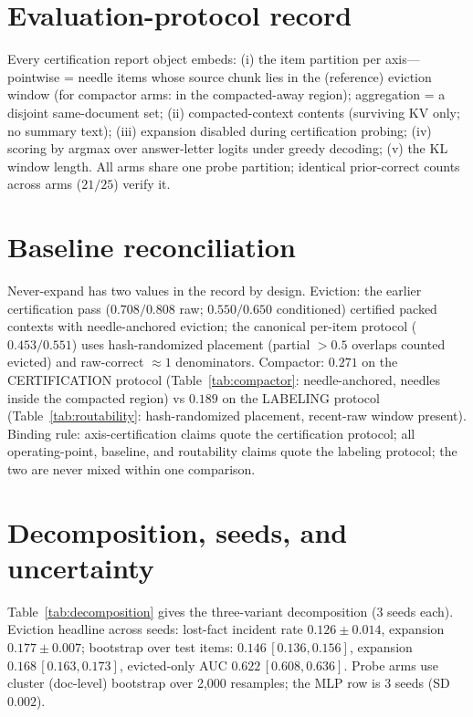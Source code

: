 \documentclass[11pt]{article}
\newcommand{\lostfact}{lost-fact incident rate}
\begin{document}
\appendix

\section{Evaluation-protocol record}
\label{app:protocol}
Every certification report object embeds: (i) the item partition per
axis---pointwise = needle items whose source chunk lies in the (reference)
eviction window (for compactor arms: in the compacted-away region);
aggregation = a disjoint same-document set; (ii) compacted-context contents
(surviving KV only; no summary text); (iii) expansion disabled during
certification probing; (iv) scoring by argmax over answer-letter logits under
greedy decoding; (v) the KL window length. All arms share one probe
partition; identical prior-correct counts across arms ($21/25$) verify it.

\section{Baseline reconciliation}
\label{app:reconciliation}
Never-expand has two values in the record by design. Eviction: the earlier
certification pass ($0.708/0.808$ raw; $0.550/0.650$ conditioned) certified
packed contexts with needle-anchored eviction; the canonical per-item
protocol ($0.453/0.551$) uses hash-randomized placement (partial $>0.5$
overlaps counted evicted) and raw-correct ${\approx}1$ denominators.
Compactor: $0.271$ on the CERTIFICATION protocol
(Table~\ref{tab:compactor}: needle-anchored, needles inside the compacted
region) vs $0.189$ on the LABELING protocol (Table~\ref{tab:routability}:
hash-randomized placement, recent-raw window present). Binding rule:
axis-certification claims quote the certification protocol; all
operating-point, baseline, and routability claims quote the labeling
protocol; the two are never mixed within one comparison.

\section{Decomposition, seeds, and uncertainty}
Table~\ref{tab:decomposition} gives the three-variant decomposition (3 seeds
each). Eviction headline across seeds: \lostfact{} $0.126 \pm 0.014$,
expansion $0.177 \pm 0.007$; bootstrap over test items:
$0.146\,[0.136, 0.156]$, expansion $0.168\,[0.163, 0.173]$, evicted-only AUC
$0.622\,[0.608, 0.636]$. Probe arms use cluster (doc-level) bootstrap over
2{,}000 resamples; the MLP row is 3 seeds (SD $0.002$).
\end{document}
